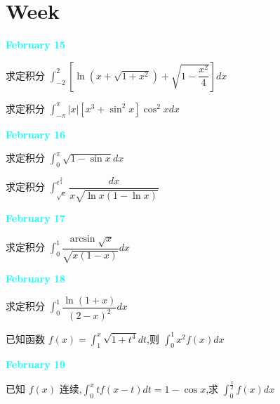 \section{Week }
\textcolor{cyan}{\textbf{February 15}}

\begin{example}[][Exam: 28.3.1]
	求定积分 $\int_{-2}^{2}[\ln(x+\sqrt{1+x^{2}})+\sqrt{1-\dfrac{x^{2}}{4}}]dx$
\end{example}

\begin{example}[][Exam: 28.3.2]
	求定积分 $\int_{-\pi}^{\pi}|x|[x^{3}+\sin^{2}x]\cos^{2}xdx$
\end{example}

\textcolor{cyan}{\textbf{February 16}}

\begin{example}[][Exam: 28.3.3]
	求定积分 $\int_{0}^{\pi}\sqrt{1-\sin x}dx$
\end{example}

\begin{example}[][Exam: 28.3.4]
	求定积分 $\int_{\sqrt{e}}^{e^{\frac{3}{4}}}\dfrac{dx}{x\sqrt{\ln x(1-\ln x)}}$
\end{example}

\textcolor{cyan}{\textbf{February 17}}

\begin{example}[][Exam: 28.3.5]
	求定积分 $\int_{0}^{1}\dfrac{\arcsin \sqrt{x}}{\sqrt{x(1-x)}}dx$
\end{example}

\textcolor{cyan}{\textbf{February 18}}

\begin{example}[][Exam: 28.3.6]
	求定积分 $\int_{0}^{1}\dfrac{\ln(1+x)}{(2-x)^{2}}dx$
\end{example}

\begin{example}[][Exam: 28.3.7]
	已知函数 $f(x)=\int_{1}^{x}\sqrt{1+t^{4}}dt$,则 $\int_{0}^{1}x^{2}f(x)dx$
\end{example}

\textcolor{cyan}{\textbf{February 19}}

\begin{example}[][Exam: 28.3.8]
	已知 $f(x)$ 连续,$\int_{0}^{x}tf(x-t)dt=1-\cos x$,求 $\int_{0}^{\frac{\pi}{2}}f(x)dx$
\end{example}

